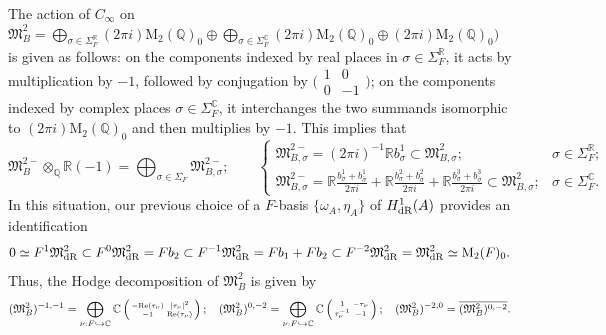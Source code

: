 \documentclass{amsart}
\theoremstyle{definition}
\theoremstyle{remark}
\numberwithin{equation}{section}
\newcommand{\M}{\mathrm{M}}
\newcommand{\mfM}{{\mathfrak M}}
\newcommand{\Q}{{\mathbb Q}}
\newcommand{\C}{{\mathbb C}}
\newcommand{\R}{{\mathbb R}}
\begin{document}
The action of $C_\infty$ on $\mfM^2_B=\bigoplus_{\sigma\in \Sigma_F^\R}(2\pi i)\M_2(\Q)_0\oplus \bigoplus_{\sigma\in\Sigma_F^\C}(2\pi i)\M_2(\Q)_0\oplus(2\pi i)\M_2(\Q)_0)$ is given as follows: on the components indexed by real places in $\sigma\in\Sigma_F^\R$, it acts by multiplication by $-1$, followed by conjugation by $\big(\begin{smallmatrix}
    1&0\\0&-1
\end{smallmatrix}\big)$; on the components indexed by complex places $\sigma\in\Sigma_F^\C$, it interchanges the two summands isomorphic to $(2\pi i)\M_2(\Q)_0$ and then multiplies by $-1$. This implies that 
    \[
    \mfM^{2-}_B\otimes_\Q \R(-1)=\bigoplus_{\sigma\in\Sigma_F}\mfM^{2-}_{B,\sigma};\qquad \left\{\begin{array}{ll}
        \mfM^{2-}_{B,\sigma}=(2\pi i)^{-1}\R b^1_\sigma\subset \mfM^{2}_{B,\sigma}; &\sigma\in\Sigma_F^\R;  \\
         \mfM^{2-}_{B,\sigma}=\R\frac{b_\sigma^1+b_{\bar\sigma}^1}{2\pi i}+\R\frac{b_\sigma^2+b_{\bar\sigma}^2}{2\pi i}+\R\frac{b_\sigma^3+b_{\bar\sigma}^3}{2\pi i}\subset \mfM^{2}_{B,\sigma};& \sigma\in\Sigma_F^\C.
    \end{array}\right.
    \]
    In this situation, our previous choice of a $F$-basis $\{\omega_A,\eta_A\}$ of $H^1_{\rm dR}(A)$ provides an  identification 
\begin{equation}\label{dRfil}
0\simeq F^1\mfM^2_{\rm dR}\subset F^0\mfM^2_{\rm dR}=Fb_2\subset F^{-1}\mfM^2_{\rm dR}=Fb_1+Fb_2\subset F^{-2}\mfM^2_{\rm dR}=\mfM^2_{\rm dR}\simeq \M_2(F)_0.
\end{equation}
Thus, the Hodge decomposition of $\mfM^2_B$ is given by
\begin{equation}\label{HdgDeceq}
  \begin{small}
    (\mfM^2_B)^{-1,-1}=\bigoplus_{{\nu}:F\hookrightarrow\C}\C\left(\begin{smallmatrix}-{\rm Re}(\tau_\nu)&|\tau_\nu|^2\\-1&{\rm Re}(\tau_\nu)\end{smallmatrix}\right);\quad  (\mfM^2_B)^{0,-2}=\bigoplus_{{\nu}:F\hookrightarrow\C}\C\left(\begin{smallmatrix}1&-\tau_\nu\\\tau_\nu^{-1}&-1\end{smallmatrix}\right); \quad  (\mfM^2_B)^{-2,0}=\overline{(\mfM^2_B)^{0,-2}}.\end{small}
    \end{equation}
\end{document}
